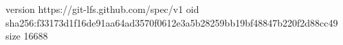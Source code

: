 version https://git-lfs.github.com/spec/v1
oid sha256:f33173d1f16de91aa64ad3570f0612e3a5b28259bb19bf48847b220f2d88cc49
size 16688
